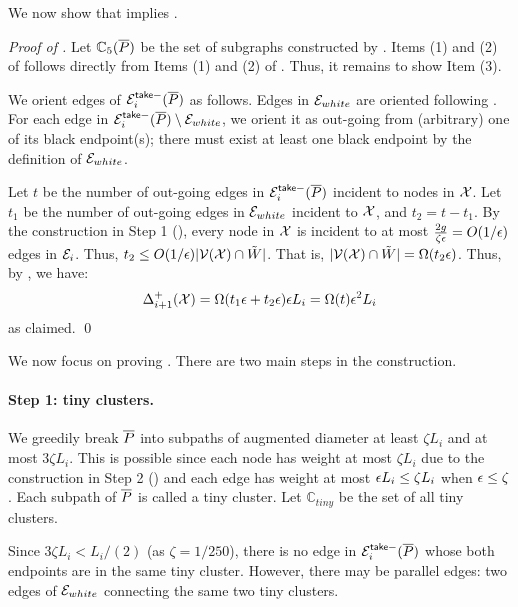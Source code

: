 We now show that  implies .

\begin{proof}[Proof of ] Let  $\mathbb{C}_5(\overline{P})$  be the set of subgraphs constructed by . Items (1) and (2) of  follows directly from Items (1) and (2) of . Thus, it remains to show Item (3).
	
	We orient edges of $\mathcal{E}_i^{\mathsf{take} -}(\overline{P})$ as follows. Edges in $  \mathcal{E}_{white}$ are oriented following . For each edge in  $\mathcal{E}_i^{\mathsf{take} -}(\overline{P})\setminus  \mathcal{E}_{white}$, we orient it as out-going from (arbitrary) one of its black endpoint(s); there must exist at least one black endpoint by the definition of $\mathcal{E}_{white}$. 
	
	Let $t$ be the number of out-going edges in $\mathcal{E}_i^{\mathsf{take} -}(\overline{P})$ incident  to nodes in $\mathcal{X}$. Let $t_1$ be the number of out-going edges in $\mathcal{E}_{white}$ incident to $\mathcal{X}$, and $t_2 =  t-t_1$. By the construction in Step 1 (), every node in $\mathcal{X}$ is incident to at most $\frac{2g}{\zeta \epsilon} = O(1/\epsilon)$ edges in  $\mathcal{E}_i$. Thus, $t_2\leq O(1/\epsilon) |\mathcal{V}(\mathcal{X})\cap \tilde{W}|$. That is, $ |\mathcal{V}(\mathcal{X})\cap \tilde{W}| = \Omega(t_2\epsilon)$. Thus, by , we have:
	 	\begin{equation*}
	 	\Delta^+_{i+1}(\mathcal{X}) =  \Omega(t_1\epsilon + t_2\epsilon)\epsilon L_i =  \Omega(t)\epsilon^2L_i
	 \end{equation*}
 as claimed.
	\qed
\end{proof}



We now focus on proving . There are two main steps in the construction. 

\paragraph{Step 1: tiny clusters.~} We greedily break $\overline{P}$ into subpaths of augmented diameter at least $\zeta L_i$ and at most $3\zeta L_i$. This is possible since each node has weight at most $\zeta L_i$ due to the construction in Step 2 () and each edge has weight at most $\epsilon L_i \leq \zeta L_i$ when $\epsilon \leq \zeta$. Each subpath of $\overline{P}$ is called a tiny cluster.  Let $\mathbb{C}_{tiny}$ be the set of all tiny clusters.

Since $3\zeta L_i < L_i/(2)$ (as $\zeta = 1/250$), there is no edge in $\mathcal{E}_i^{\mathsf{take} -}(\overline{P})$ whose both endpoints are in the same tiny cluster.  However, there may be parallel edges: two edges of $\mathcal{E}_{white}$ connecting the same two tiny clusters.



